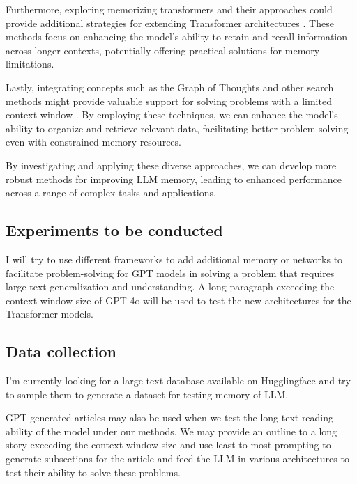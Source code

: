 \documentclass{article}
\begin{document}
Furthermore, exploring memorizing transformers and their approaches could provide additional strategies for extending Transformer architectures \cite{wu2022memorizingtransformers}. These methods focus on enhancing the model’s ability to retain and recall information across longer contexts, potentially offering practical solutions for memory limitations.

Lastly, integrating concepts such as the Graph of Thoughts and other search methods might provide valuable support for solving problems with a limited context window \cite{Besta_2024}. By employing these techniques, we can enhance the model’s ability to organize and retrieve relevant data, facilitating better problem-solving even with constrained memory resources.

By investigating and applying these diverse approaches, we can develop more robust methods for improving LLM memory, leading to enhanced performance across a range of complex tasks and applications.

\subsection{Experiments to be conducted}

I will try to use different frameworks to add additional memory or networks to facilitate problem-solving for GPT models in solving a problem that requires large text generalization and understanding. A long paragraph exceeding the context window size of GPT-4o will be used to test the new architectures for the Transformer models.

\subsection{Data collection}

I'm currently looking for a large text database available on Hugglingface and try to sample them to generate a dataset for testing memory of LLM.

GPT-generated articles may also be used when we test the long-text reading ability of the model under our methods. We may provide an outline to a long story exceeding the context window size and use least-to-most prompting \cite{zhou2023leasttomostpromptingenablescomplex} to generate subsections for the article and feed the LLM in various architectures to test their ability to solve these problems.


\medskip
{
\small
{}

}
\end{document}
